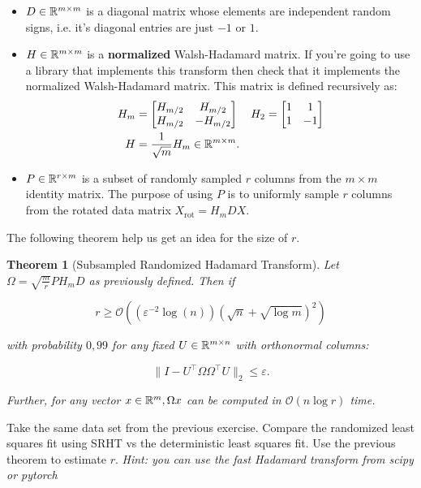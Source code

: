 \documentclass[11pt]{article}
\newcommand\bigO[1]{{\ensuremath{\mathcal{O}(#1)}}}
\newtheorem{theorem}{Theorem}
\begin{document}
\begin{itemize}
    \item $D \in \mathbb{R}^{m \times m}$ is a diagonal matrix whose elements are independent random signs, i.e. it's diagonal entries are just $-1$ or $1$.
    \item $H \in \mathbb{R}^{m \times m}$ is a \textbf{normalized} Walsh-Hadamard matrix. If you're going to use a library that implements this transform then check that it implements the normalized Walsh-Hadamard matrix. This matrix is defined recursively as:
    \begin{align*}
    H_m &= \begin{bmatrix} H_{m/2} & H_{m/2} \\ H_{m/2} & -H_{m/2} \end{bmatrix} & H_2 &= \begin{bmatrix} 1 & 1 \\ 1 & -1 \end{bmatrix} \\
    H &= \frac{1}{\sqrt{m}} H_m \in \mathbb{R}^{m \times m}.
    \end{align*}
    \item $P \in \mathbb{R}^{r \times m}$ is a subset of randomly sampled $r$ columns from the $m \times m$ identity matrix. The purpose of using $P$ is to uniformly sample $r$ columns from the rotated data matrix $X_{\text{rot}} = H_{m}DX$.
\end{itemize}

The following theorem help us get an idea for the size of $r$.

\begin{theorem}[Subsampled Randomized Hadamard Transform]
Let $\Omega = \sqrt{\frac{m}{r}}PH_{m}D$ as previously defined. Then if

\[ r \geq \bigO{( \varepsilon^{-2}\log(n)) (\sqrt{n} + \sqrt{\log{m}})^2 }\]

with probability $0,99$ for any fixed $U \in \mathbb{R}^{m \times n}$ with orthonormal columns:

\[ \| I - U^\top \Omega \Omega^\top U\|_2 \leq \varepsilon. \]

Further, for any vector $x \in \mathbb{R}^{m}, \Omega x$ can be computed in $\bigO{n \log{r}}$ time.

\end{theorem}

Take the same data set from the previous exercise. Compare the randomized least squares fit using SRHT vs the deterministic least squares fit. Use the previous theorem to estimate $r$. \textit{Hint: you can use the fast Hadamard transform from scipy or pytorch}




\end{document}
